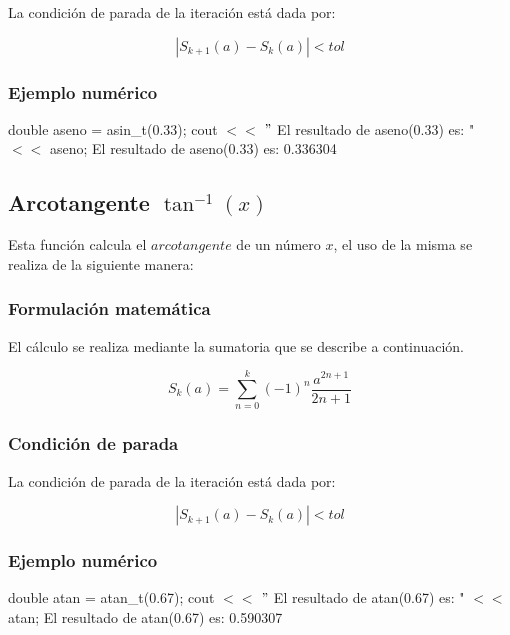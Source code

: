 \documentclass[10pt,a4paper]{article}
\begin{document}
	La condición de parada de la iteración está dada por: 
	
	\begin{equation}\label{key9}
		\left\lvert S_{k+1}(a) - S_{k}(a) \right\lvert < tol
	\end{equation}
	
	\subsubsection{Ejemplo numérico}

	double aseno = asin{\_}t(0.33); \newline
	cout $<<$ $"$ El resultado de aseno(0.33) es: " $<<$ aseno; \newline
	El resultado de aseno(0.33) es: 0.336304\newline
	
	\subsection{Arcotangente $\tan^{-1}(x)$}
	
	Esta función calcula el $arcotangente$ de un número $x$, el uso de la misma se realiza de la siguiente manera:
	
	\begin{center}
	\end{center}
	
	\subsubsection{Formulación matemática}
	
	El cálculo se realiza mediante la sumatoria que se describe a continuación.
	
	\begin{equation}\label{key22}
		S_{k}(a) = \sum_{n=0}^{k}(-1)^{n}\frac{a^{2n+1}}{2n + 1}
	\end{equation}
	
	\subsubsection{Condición de parada}
	
	La condición de parada de la iteración está dada por: 
	
	\begin{equation}\label{key9}
		\left\lvert S_{k+1}(a) - S_{k}(a) \right\lvert < tol
	\end{equation}
	
	\subsubsection{Ejemplo numérico}

	double atan = atan{\_}t(0.67); \newline
	cout $<<$ $"$ El resultado de atan(0.67) es: " $<<$ atan; \newline
	El resultado de atan(0.67) es: 0.590307\newline
	
	
\end{document}
